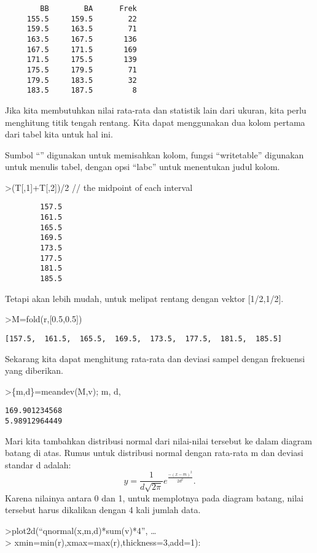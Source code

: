 \documentclass[
]{book}
\begin{document}
\begin{verbatim}
        BB        BA      Frek
     155.5     159.5        22
     159.5     163.5        71
     163.5     167.5       136
     167.5     171.5       169
     171.5     175.5       139
     175.5     179.5        71
     179.5     183.5        32
     183.5     187.5         8
\end{verbatim}

Jika kita membutuhkan nilai rata-rata dan statistik lain dari ukuran, kita perlu menghitung titik tengah rentang. Kita dapat menggunakan dua kolom pertama dari tabel kita untuk hal ini.

Sumbol ``\textbar{}'' digunakan untuk memisahkan kolom, fungsi ``writetable'' digunakan untuk menulis tabel, dengan opsi ``labc'' untuk menentukan judul kolom.

\textgreater(T{[},1{]}+T{[},2{]})/2 // the midpoint of each interval

\begin{verbatim}
        157.5 
        161.5 
        165.5 
        169.5 
        173.5 
        177.5 
        181.5 
        185.5 
\end{verbatim}

Tetapi akan lebih mudah, untuk melipat rentang dengan vektor {[}1/2,1/2{]}.

\textgreater M=fold(r,{[}0.5,0.5{]})

\begin{verbatim}
[157.5,  161.5,  165.5,  169.5,  173.5,  177.5,  181.5,  185.5]
\end{verbatim}

Sekarang kita dapat menghitung rata-rata dan deviasi sampel dengan frekuensi yang diberikan.

\textgreater\{m,d\}=meandev(M,v); m, d,

\begin{verbatim}
169.901234568
5.98912964449
\end{verbatim}

Mari kita tambahkan distribusi normal dari nilai-nilai tersebut ke dalam diagram batang di atas. Rumus untuk distribusi normal dengan rata-rata m dan deviasi standar d adalah: \[y=\frac{1}{d\sqrt{2\pi}}e^{\frac{-(x-m)^2}{2d^2}}.\]Karena nilainya antara 0 dan 1, untuk memplotnya pada diagram batang, nilai tersebut harus dikalikan dengan 4 kali jumlah data.

\textgreater plot2d(``qnormal(x,m,d)*sum(v)*4'', \ldots{}\\
\textgreater{} xmin=min(r),xmax=max(r),thickness=3,add=1):
\end{document}
